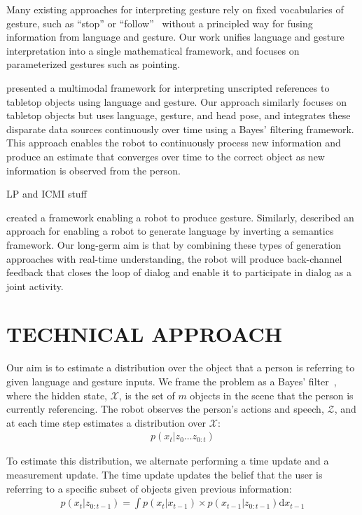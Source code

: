 \documentclass[letterpaper, 10 pt, conference]{ieeeconf}
\begin{document}
Many existing approaches for interpreting gesture rely on fixed
vocabularies of gesture, such as ``stop'' or
``follow''~\citep{waldherr00, marge11} without a principled way for
fusing information from language and gesture.  Our work unifies
language and gesture interpretation into a single mathematical
framework, and focuses on parameterized gestures such as pointing.




\citet{matuszek14} presented a multimodal framework for interpreting
unscripted references to tabletop objects using language and gesture.
Our approach similarly focuses on tabletop objects but uses language,
gesture, and head pose, and integrates these disparate data sources
continuously over time using a Bayes' filtering framework.  This
approach enables the robot to continuously process new information and
produce an estimate that converges over time to the correct object as
new information is observed from the person.  

LP and ICMI stuff

\citet{dragan13} created a framework enabling a robot to produce
gesture.  Similarly, \citet{tellex14} described an approach for
enabling a robot to generate language by inverting a semantics
framework.  Our long-germ aim is that by combining these types of
generation approaches with real-time understanding, the robot will
produce back-channel feedback that closes the loop of dialog and
enable it to participate in dialog as a joint activity.

\section{TECHNICAL APPROACH}

Our aim is to estimate a distribution over the object that a person is
referring to given language and gesture inputs.  We frame the problem
as a Bayes' filter~\citep{thrun08}, where the hidden state,
$\mathcal{X}$, is the set of $m$ objects in the scene that the person
is currently referencing. The robot observes the person's actions and
speech, $\mathcal{Z}$, and at each time step estimates a distribution
over $\mathcal{X}$:
\begin{align}
  p(x_t | z_0 \dots z_{0:t})
\end{align}


To estimate this distribution, we alternate performing a time update
and a measurement update.  The time update updates the belief that the
user is referring to a specific subset of objects given previous
information:
\begin{align}
p(x_t | z_{0:t-1}) = \int p(x_t|x_{t-1})\times p(x_{t-1} | z_{0:t-1}) \text{d}x_{t-1}
\end{align}
\end{document}
